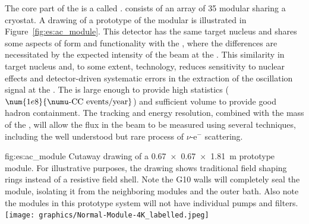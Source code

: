 The core part of the   is a  called .   consists of an array of 35 modular  sharing a cryostat.  A drawing of a prototype of the modular  is illustrated in Figure~\ref{fig:es:ac_module}.  %
This detector has the same target nucleus and shares some aspects of form and functionality with the , where the differences are necessitated by the expected intensity of the beam at the .  This similarity in target nucleus and, to some extent, technology, reduces sensitivity to nuclear effects and detector-driven systematic errors in the extraction of the oscillation signal at the  .  The  is large enough to provide high statistics ($\num{1e8}{\numu \text{-CC events/year}}$) and sufficient volume to provide good hadron containment.  The tracking and energy resolution, combined with the mass of the , will allow the flux in the beam to be measured using several techniques, including the well understood but rare process of $\nu$-e$^{-}$ scattering.

\begin{dunefigure}{fig:es:ac_module}
{Cutaway drawing of a \SI{0.67 x 0.67 x 1.81}{\metre}  prototype module. For illustrative purposes, the drawing shows traditional field shaping rings instead of a resistive field shell. Note the G10 walls will completely seal the module, isolating it from the neighboring modules and the outer  bath. Also note the modules in this prototype system will not have individual pumps and filters.}
\texttt{[image: graphics/Normal-Module-4K\_labelled.jpeg]}
\end{dunefigure}

